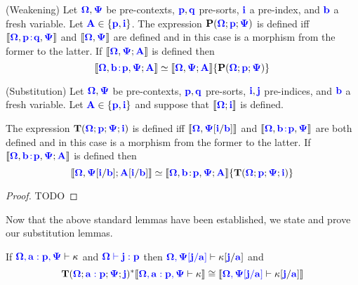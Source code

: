\documentclass[sigplan,10pt,review,anonymous]{acmart}
\newcommand{\blu}[1]{\textbf{\color{blue}{#1}}}
\newcommand{\blum}[1]{\mathbf{\color{blue}{#1}}}
\newcommand{\sem}[1]{\llbracket #1 \rrbracket}
\newcommand{\mbf}[1]{\mathbf{#1}}
\begin{document}
\begin{lemma}
(Weakening) Let $\blum{\Omega},\blum{\Psi}$ be pre-contexts, $\blum{p},\blum{q}$ pre-sorts, $\blum{i}$ a pre-index, and $\blum{b}$ a fresh variable. Let $\blum{A} \in \{ \blum{p}, \blum{i} \}$. The expression $\mbf{P}(\blum{\Omega} ; \blum{p} ; \blum{\Psi})$ is defined iff $\sem{\blum{\Omega}, \blum{p \! : \! q}, \blum{\Psi}}$ and $\sem{\blum{\Omega}, \blum{\Psi}}$ are defined and in this case is a morphism from the former to the latter. If $\sem{\blum{\Omega},\blum{\Psi} ; \blum{A}}$ is defined then 
$$\sem{\blum{\Omega}, \blum{b \! : \! p}, \blum{\Psi} ; \blum{A}} \simeq \sem{\blum{\Omega} , \blum{\Psi} ; \blum{A}} \{ \mbf{P}(\blum{\Omega}; \blum{p} ; \blum{\Psi}) \}$$
\end{lemma}

\begin{lemma}
\label{lemma:indsortsub}
(Substitution) Let $\blum{\Omega},\blum{\Psi}$ be pre-contexts, $\blum{p},\blum{q}$ pre-sorts, $\blum{i}, \blum{j}$ pre-indices, and $\blum{b}$ a fresh variable. Let $\blum{A} \in \{ \blum{p}, \blum{i} \}$ and suppose that $\sem{\blum{\Omega} ; \blum{i}}$ is defined. 

The expression $\mbf{T}(\blum{\Omega};\blum{p};\blum{\Psi};\blum{i})$ is defined iff $\sem{\blum{\Omega}, \blum{\Psi}[\blum{i}/\blum{b}]}$ and $\sem{\blum{\Omega} , \blum{b \! : \! p}, \blum{\Psi}}$ are both defined and in this case is a morphism from the former to the latter. If $\sem{\blum{\Omega},\blum{b \! : \! p},\blum{\Psi} ; \blum{A}}$ is defined then 
$$\sem{\blum{\Omega},\blum{\Psi}[\blum{i}/\blum{b}]; \blum{A}[\blum{i}/\blum{b}]} \simeq \sem{\blum{\Omega},\blum{b} \! : \! \blum{p},\blum{\Psi};\blum{A}} \{ \mbf{T}(\blum{\Omega} ; \blum{p} ; \blum{\Psi} ; \blum{i}) \}$$
\end{lemma}

\begin{proof}
TODO
\end{proof}

Now that the above standard lemmas have been established, we state and prove our substitution lemmas.

\begin{lemma}
If $\blum{\Omega,a : p, \Psi} \vdash \kappa$ and $\blum{\Omega \vdash j : p}$ then $\blum{\Omega, \Psi[j/a]} \vdash \kappa[\blum{j}/\blum{a}]$
and $$\mbf{T}(\blum{\Omega} ; \blum{a : p} ; \blum{\Psi} ; \blu{j})^* \sem{\blum{\Omega,a:p,\Psi} \vdash \kappa} \cong \sem{\blum{\Omega, \Psi[j/a]} \vdash \kappa[\blum{j}/\blum{a}]}$$
\end{lemma}
\end{document}
